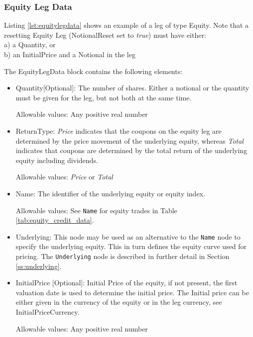 \subsubsection{Equity Leg Data}
\label{ss:equitylegdata}

Listing \ref{lst:equitylegdata} shows an example of a leg of type Equity. Note that a resetting Equity Leg (NotionalReset set to  \emph{true}) must have either: \\
a) a Quantity, or \\
b) an InitialPrice and a Notional in the leg

The EquityLegData block contains the following elements:

\begin{itemize}
\item Quantity[Optional]: The number of shares. Either a notional or the quantity must be given for the leg, but not both at the same time.

  Allowable values: Any positive real number

\item ReturnType: \emph{Price} indicates that the coupons on the equity leg are determined by the price movement of the underlying equity, whereas  \emph{Total} indicates that coupons are determined by the total return of the underlying equity including dividends.

Allowable values:  \emph{Price} or  \emph{Total}

\item Name: The identifier of the underlying equity or equity index.

Allowable values: See \lstinline!Name! for equity trades in Table \ref{tab:equity_credit_data}. \\

\item Underlying:  This node may be used as an alternative to the \lstinline!Name! node to specify the underlying equity. This in turn defines the equity curve used for pricing. The \lstinline!Underlying! node is described in further detail in Section \ref{ss:underlying}. \\

\item InitialPrice [Optional]: Initial Price of the equity, if not present, the first valuation date is used to
  determine the initial price. The Initial price can be either given in the currency of the equity or in the leg
  currency, see InitialPriceCurrency.

Allowable values: Any positive real number


\end{itemize}

